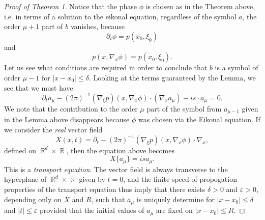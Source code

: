 \documentclass{article}
\theoremstyle{plain}
\theoremstyle{remark}
\theoremstyle{definition}
\DeclareMathOperator{\RR}{\mathbb{R}}
\begin{document}
\begin{proof}[Proof of Theorem 1]

Notice that the phase $\phi$ is chosen as in the Theorem above, i.e. in terms of a solution to the eikonal equation, regardless of the symbol $a$, the order $\mu + 1$ part of $b$ vanishes, because
%
\[ \partial_t \phi = p(x_0, \xi_0) \]
%
and
%
\[ p( x, \nabla_x \phi ) = p(x_0,\xi_0). \]
%
Let us see what conditions are required in order to conclude that $b$ is a symbol of order $\mu - 1$ for $|x - x_0| \leq \delta$. Looking at the terms guaranteed by the Lemma, we see that we must have
%
\[ \partial_t a_\mu - (2\pi)^{-1} (\nabla_\xi p)(x, \nabla_x \phi) \cdot (\nabla_x a_\mu) - i s \cdot a_\mu = 0. \]
%
We note that the contribution to the order $\mu$ part of the symbol from $a_{\mu-1}$ given in the Lemma above disappears because $\phi$ was chosen via the Eikonal equation. If we consider the \emph{real} vector field
%
\[ X(x,t) = \partial_t - (2\pi)^{-1} (\nabla_\xi p)(x,\nabla_x \phi) \cdot \nabla_x, \]
%
defined on $\RR^d \times \RR$, then the equation above becomes
%
\[ X \{ a_\mu \} = i s a_\mu. \]
%
This is a \emph{transport equation}. The vector field is always transverse to the hyperplane of $\RR^d \times \RR$ given by $t = 0$, and the finite speed of propogation properties of the transport equation thus imply that there exists $\delta > 0$ and $\varepsilon > 0$, depending only on $X$ and $R$, such that $a_\mu$ is uniquely determine for $|x - x_0| \leq \delta$ and $|t| \leq \varepsilon$ provided that the initial values of $a_\mu$ are fixed on $|x - x_0| \leq R$.


\end{proof}
\end{document}
